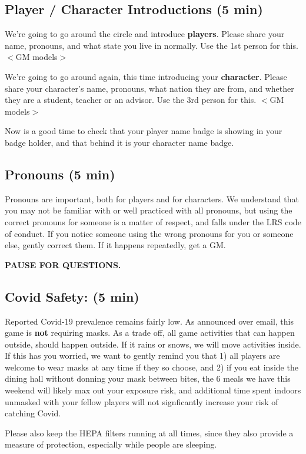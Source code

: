 \documentclass[green]{GL2020}
\begin{document}
\subsection*{Player / Character Introductions (5 min)}
We’re going to go around the circle and introduce \textbf{players}. Please share your name, pronouns, and what state you live in normally. Use the 1st person for this. $<$GM models$>$

We’re going to go around again, this time introducing your \textbf{character}. Please share your character’s name, pronouns, what nation they are from, and whether they are a student, teacher or an advisor. Use the 3rd person for this. $<$GM models$>$

Now is a good time to check that your player name badge is showing in your badge holder, and that behind it is your character name badge.


\subsection*{Pronouns (5 min)}
Pronouns are important, both for players and for characters. We understand that you may not be familiar with or well practiced with all pronouns, but using the correct pronouns for someone is a matter of respect, and falls under the LRS code of conduct. If you notice someone using the wrong pronouns for you or someone else, gently correct them. If it happens repeatedly, get a GM.

\textbf{PAUSE FOR QUESTIONS.}

\subsection*{Covid Safety: (5 min)}
Reported Covid-19 prevalence remains fairly low. As announced over email, this game is \textbf{not} requiring masks. As a trade off, all game activities that can happen outside, should happen outside. If it rains or snows, we will move activities inside. If this has you worried, we want to gently remind you that 1) all players are welcome to wear masks at any time if they so choose, and 2) if you eat inside the dining hall without donning your mask between bites, the 6 meals we have this weekend will likely max out your exposure risk, and additional time spent indoors unmasked with your fellow players will not signficantly increase your risk of catching Covid.

Please also keep the HEPA filters running at all times, since they also provide a measure of protection, especially while people are sleeping.
\end{document}

